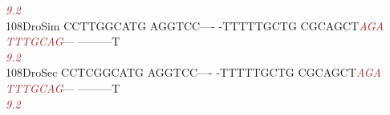 \documentclass[11pt,twoside,reqno,a4paper]{article}
\begin{document}
{\hspace*{4\charwidth}\hspace*{7\charwidth}\hspace*{1\charwidth}\hspace*{1\charwidth}\hspace*{1\charwidth}\hspace*{37\charwidth}\textit{\textcolor{Brown}{9.2}}\hspace*{1\charwidth}\hspace*{1\charwidth}\hspace*{1\charwidth}\\
108\hspace*{1\charwidth}DroSim	CCTTGGCATG	AGGTCC----	-TTTTTGCTG	CGCAGCT\textit{\textcolor{Brown}{A}}\textit{\textcolor{Brown}{G}}\textit{\textcolor{Brown}{A}}	\textit{\textcolor{Brown}{T}}\textit{\textcolor{Brown}{T}}\textit{\textcolor{Brown}{T}}\textit{\textcolor{Brown}{G}}\textit{\textcolor{Brown}{C}}\textit{\textcolor{Brown}{A}}\textit{\textcolor{Brown}{G}}---	---------T	\\
\hspace*{4\charwidth}\hspace*{7\charwidth}\hspace*{1\charwidth}\hspace*{1\charwidth}\hspace*{1\charwidth}\hspace*{37\charwidth}\textit{\textcolor{Brown}{9.2}}\hspace*{1\charwidth}\hspace*{1\charwidth}\hspace*{1\charwidth}\\
108\hspace*{1\charwidth}DroSec	CCTCGGCATG	AGGTCC----	-TTTTTGCTG	CGCAGCT\textit{\textcolor{Brown}{A}}\textit{\textcolor{Brown}{G}}\textit{\textcolor{Brown}{A}}	\textit{\textcolor{Brown}{T}}\textit{\textcolor{Brown}{T}}\textit{\textcolor{Brown}{T}}\textit{\textcolor{Brown}{G}}\textit{\textcolor{Brown}{C}}\textit{\textcolor{Brown}{A}}\textit{\textcolor{Brown}{G}}---	---------T	\\
\hspace*{4\charwidth}\hspace*{7\charwidth}\hspace*{1\charwidth}\hspace*{1\charwidth}\hspace*{1\charwidth}\hspace*{37\charwidth}\textit{\textcolor{Brown}{9.2}}\hspace*{1\charwidth}\hspace*{1\charwidth}\hspace*{1\charwidth}\\
}
\end{document}
